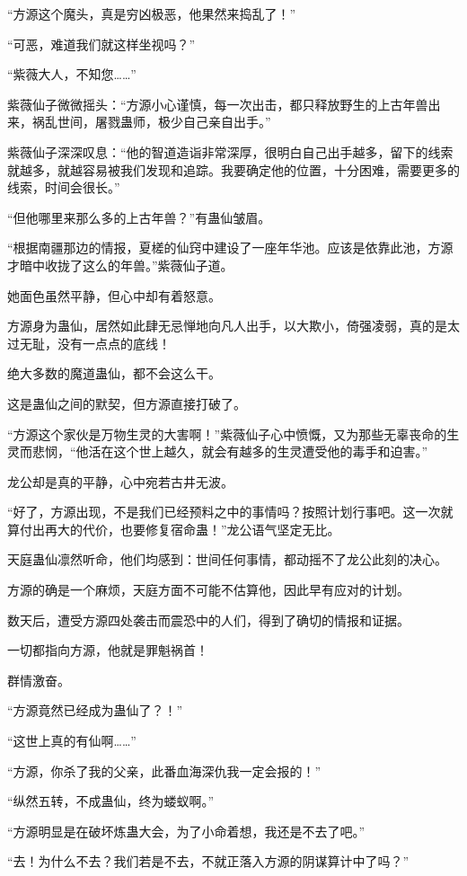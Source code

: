 \begin{this_body}
“方源这个魔头，真是穷凶极恶，他果然来捣乱了！”

“可恶，难道我们就这样坐视吗？”

“紫薇大人，不知您……”

紫薇仙子微微摇头：“方源小心谨慎，每一次出击，都只释放野生的上古年兽出来，祸乱世间，屠戮蛊师，极少自己亲自出手。”

紫薇仙子深深叹息：“他的智道造诣非常深厚，很明白自己出手越多，留下的线索就越多，就越容易被我们发现和追踪。我要确定他的位置，十分困难，需要更多的线索，时间会很长。”

“但他哪里来那么多的上古年兽？”有蛊仙皱眉。

“根据南疆那边的情报，夏槎的仙窍中建设了一座年华池。应该是依靠此池，方源才暗中收拢了这么的年兽。”紫薇仙子道。

她面色虽然平静，但心中却有着怒意。

方源身为蛊仙，居然如此肆无忌惮地向凡人出手，以大欺小，倚强凌弱，真的是太过无耻，没有一点点的底线！

绝大多数的魔道蛊仙，都不会这么干。

这是蛊仙之间的默契，但方源直接打破了。

“方源这个家伙是万物生灵的大害啊！”紫薇仙子心中愤慨，又为那些无辜丧命的生灵而悲悯，“他活在这个世上越久，就会有越多的生灵遭受他的毒手和迫害。”

龙公却是真的平静，心中宛若古井无波。

“好了，方源出现，不是我们已经预料之中的事情吗？按照计划行事吧。这一次就算付出再大的代价，也要修复宿命蛊！”龙公语气坚定无比。

天庭蛊仙凛然听命，他们均感到：世间任何事情，都动摇不了龙公此刻的决心。

方源的确是一个麻烦，天庭方面不可能不估算他，因此早有应对的计划。

数天后，遭受方源四处袭击而震恐中的人们，得到了确切的情报和证据。

一切都指向方源，他就是罪魁祸首！

群情激奋。

“方源竟然已经成为蛊仙了？！”

“这世上真的有仙啊……”

“方源，你杀了我的父亲，此番血海深仇我一定会报的！”

“纵然五转，不成蛊仙，终为蝼蚁啊。”

“方源明显是在破坏炼蛊大会，为了小命着想，我还是不去了吧。”

“去！为什么不去？我们若是不去，不就正落入方源的阴谋算计中了吗？”


\end{this_body}
